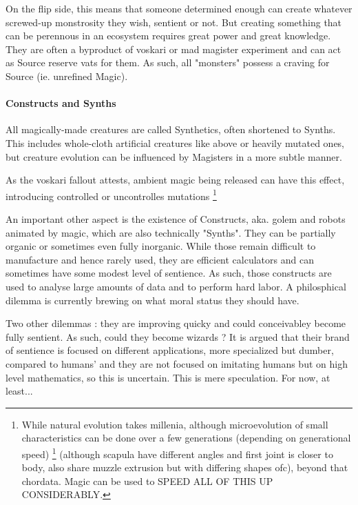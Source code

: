 On the flip side, this means that someone determined enough can create whatever screwed-up monstrosity they wish, sentient or not. But creating something that can be perennous in an ecosystem requires great power and great knowledge. They are often a byproduct of voskari or mad magister experiment and can act as Source reserve vats for them. As such, all "monsters" possess a craving for Source (ie. unrefined Magic).



\paragraph{Constructs and Synths}





All magically-made creatures are called Synthetics, often shortened to Synths. This includes whole-cloth artificial creatures like above or heavily mutated ones, but creature evolution can be influenced by Magisters in a more subtle manner.


As the voskari fallout attests, ambient magic being released can have this effect, introducing controlled or uncontrolles mutations \footnote{While natural evolution takes millenia, although microevolution of small characteristics can be done over a few generations (depending on generational speed)
\footnote{Quadrupeds will generally share a bone structure and muscle attachments, traces of which can be seen in fish even. Muscle attachments for the face are cheekbones and lower far mandible} (although scapula have different angles and first joint is closer to body, also share muzzle extrusion but with differing shapes ofc), beyond that chordata. Magic can be used to SPEED ALL OF THIS UP CONSIDERABLY.}






An important other aspect is the existence of Constructs, aka. golem and robots animated by magic, which are also technically "Synths". They can be partially organic or sometimes even fully inorganic. While those remain difficult to manufacture and hence rarely used, they are efficient calculators and can sometimes have some modest level of sentience. As such, those constructs are used to analyse large amounts of data and to perform hard labor. A philosphical dilemma is currently brewing on what moral status they should have.

Two other dilemmas : they are improving quicky and could conceivabley become fully sentient. As such, could they become wizards ? It is argued that their brand of sentience is focused on different applications, more specialized but dumber, compared to humans' and they are not focused on imitating humans but on high level mathematics, so this is uncertain. This is mere speculation. For now, at least...







